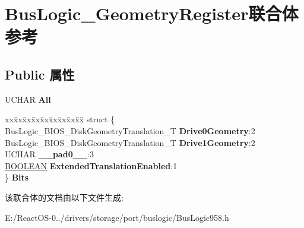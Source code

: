 \hypertarget{union_bus_logic___geometry_register}{}\section{Bus\+Logic\+\_\+\+Geometry\+Register联合体 参考}
\label{union_bus_logic___geometry_register}
\subsection*{Public 属性}
\begin{DoxyCompactItemize}
\item 
\mbox{\label{union_bus_logic___geometry_register_a0198fce54b5bfdc09f555db663e58129}} 
U\+C\+H\+AR {\bfseries All}
\item 
\mbox{\label{union_bus_logic___geometry_register_a0e16354f2cee86db7f043d282da93eaa}} 
\begin{tabbing}
xx\=xx\=xx\=xx\=xx\=xx\=xx\=xx\=xx\=\kill
struct \{\\
\>BusLogic\_BIOS\_DiskGeometryTranslation\_T {\bfseries Drive0Geometry}:2\\
\>BusLogic\_BIOS\_DiskGeometryTranslation\_T {\bfseries Drive1Geometry}:2\\
\>UCHAR {\bfseries \_\_pad0\_\_}:3\\
\>\hyperlink{_processor_bind_8h_a112e3146cb38b6ee95e64d85842e380a}{BOOLEAN} {\bfseries ExtendedTranslationEnabled}:1\\
\} {\bfseries Bits}\\

\end{tabbing}\end{DoxyCompactItemize}


该联合体的文档由以下文件生成\+:\begin{DoxyCompactItemize}
\item 
E\+:/\+React\+O\+S-\/0../drivers/storage/port/buslogic/Bus\+Logic958.\+h\end{DoxyCompactItemize}
